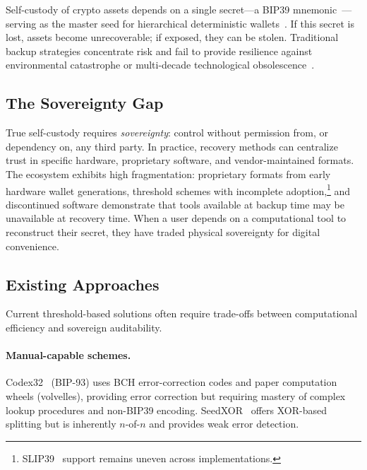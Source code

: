 \documentclass[11pt]{article}
\begin{document}
Self-custody of crypto assets depends on a single secret---a BIP39 mnemonic~\cite{bip39}---serving as the master seed for hierarchical deterministic wallets~\cite{bip32}. If this secret is lost, assets become unrecoverable; if exposed, they can be stolen. Traditional backup strategies concentrate risk and fail to provide resilience against environmental catastrophe or multi-decade technological obsolescence~\cite{eskandari2015}.

\subsection{The Sovereignty Gap}

True self-custody requires \emph{sovereignty}: control without permission from, or dependency on, any third party. In practice, recovery methods can centralize trust in specific hardware, proprietary software, and vendor-maintained formats. The ecosystem exhibits high fragmentation: proprietary formats from early hardware wallet generations, threshold schemes with incomplete adoption,\footnote{SLIP39~\cite{slip39} support remains uneven across implementations.} and discontinued software demonstrate that tools available at backup time may be unavailable at recovery time. When a user depends on a computational tool to reconstruct their secret, they have traded physical sovereignty for digital convenience.

\subsection{Existing Approaches}

Current threshold-based solutions often require trade-offs between computational efficiency and sovereign auditability.

\paragraph{Manual-capable schemes.} Codex32~\cite{codex32} (BIP-93) uses BCH error-correction codes and paper computation wheels (volvelles), providing error correction but requiring mastery of complex lookup procedures and non-BIP39 encoding. SeedXOR~\cite{seedxor} offers XOR-based splitting but is inherently $n$-of-$n$ and provides weak error detection.
\end{document}
